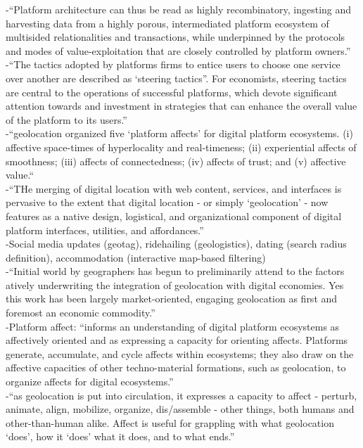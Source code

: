 -{\color{orange}“Platform architecture can thus be read as highly recombinatory, ingesting and harvesting data from a highly porous, intermediated platform ecosystem of multisided relationalities and transactions, while underpinned by the protocols and modes of value-exploitation that are closely controlled by platform owners.”\cite{Barns2020}}\\
-{\color{orange}“The tactics adopted by platforms firms to entice users to choose one service over another are described as ‘steering tactics”. For economists, steering tactics are central to the operations of successful platforms, which devote significant attention towards and investment in strategies that can enhance the overall value of the platform to its users.”\cite{Barns2020}}\\
-{\color{orange}“geolocation organized five ‘platform affects’ for digital platform ecosystems. (i) affective space-times of hyperlocality and real-timeness; (ii) experiential affects of smoothness; (iii) affects of connectedness; (iv) affects of trust; and (v) affective value.“\cite{Leszczynski2019}}\\
-{\color{orange}“THe merging of digital location with web content, services, and interfaces is pervasive to the extent that digital location - or simply ‘geolocation’ - now features as a native design, logistical, and organizational component of digital platform interfaces, utilities, and affordances.”\cite{Leszczynski2019}}\\
-{\color{orange}Social media updates (geotag), ridehailing (geologistics), dating (search radius definition), accommodation (interactive map-based filtering)\cite{Leszczynski2019}}\\
-{\color{orange}“Initial world by geographers has begun to preliminarily attend to the factors atively underwriting the integration of geolocation with digital economies. Yes this work has been largely market-oriented, engaging geolocation as first and foremost an economic commodity.”\cite{Leszczynski2019}}\\
-{\color{orange}Platform affect: “informs an understanding of digital platform ecosystems as affectively oriented and as expressing a capacity for orienting affects. Platforms generate, accumulate, and cycle affects within ecosystems; they also draw on the affective capacities of other techno-material formations, such as geolocation, to organize affects for digital ecosystems.”\cite{Leszczynski2019}}\\
-{\color{orange}“as geolocation is put into circulation, it expresses a capacity to affect - perturb, animate, align, mobilize, organize, dis/assemble - other things, both humans and other-than-human alike. Affect is useful for grappling with what geolocation ‘does’, how it ‘does’ what it does, and to what ends.”\cite{Leszczynski2019}}\\
